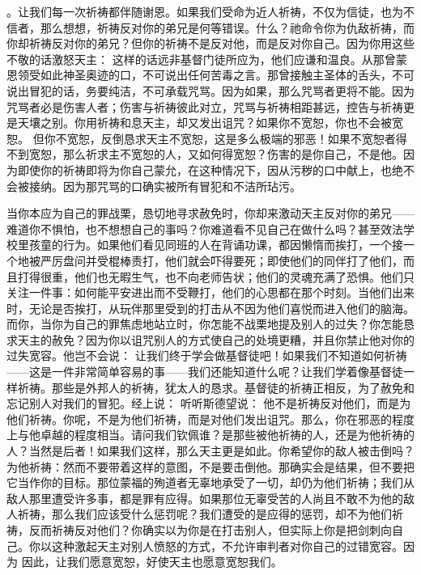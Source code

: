 。让我们每一次祈祷都伴随谢恩。如果我们受命为近人祈祷，不仅为信徒，也为不信者，那么想想，祈祷反对你的弟兄是何等错误。什么？祂命令你为仇敌祈祷，而你却祈祷反对你的弟兄？但你的祈祷不是反对他，而是反对你自己。因为你用这些不敬的话激怒天主：    这样的话远非基督门徒所应为，他们应谦和温良。从那曾蒙恩领受如此神圣奥迹的口，不可说出任何苦毒之言。那曾接触主圣体的舌头，不可说出冒犯的话，务要纯洁，不可承载咒骂。因为如果，那么咒骂者更将不能。因为咒骂者必是伤害人者；伤害与祈祷彼此对立，咒骂与祈祷相距甚远，控告与祈祷更是天壤之别。你用祈祷和息天主，却又发出诅咒？如果你不宽恕，你也不会被宽恕。 但你不宽恕，反倒恳求天主不宽恕，这是多么极端的邪恶！如果不宽恕者得不到宽恕，那么祈求主不宽恕的人，又如何得宽恕？伤害的是你自己，不是他。因为即使你的祈祷即将为你自己蒙允，在这种情况下，因从污秽的口中献上，也绝不会被接纳。因为那咒骂的口确实被所有冒犯和不洁所玷污。\par

当你本应为自己的罪战栗，恳切地寻求赦免时，你却来激动天主反对你的弟兄——难道你不惧怕，也不想想自己的事吗？你难道看不见自己在做什么吗？甚至效法学校里孩童的行为。如果他们看见同班的人在背诵功课，都因懒惰而挨打，一个接一个地被严厉盘问并受棍棒责打，他们就会吓得要死；即使他们的同伴打了他们，而且打得很重，他们也无暇生气，也不向老师告状；他们的灵魂充满了恐惧。他们只关注一件事：如何能平安进出而不受鞭打，他们的心思都在那个时刻。当他们出来时，无论是否挨打，从玩伴那里受到的打击从不因为他们喜悦而进入他们的脑海。而你，当你为自己的罪焦虑地站立时，你怎能不战栗地提及别人的过失？你怎能恳求天主的赦免？因为你以诅咒别人的方式使自己的处境更糟，并且你禁止他对你的过失宽容。他岂不会说： 让我们终于学会做基督徒吧！如果我们不知道如何祈祷——这是一件非常简单容易的事——我们还能知道什么呢？让我们学着像基督徒一样祈祷。那些是外邦人的祈祷，犹太人的恳求。基督徒的祈祷正相反，为了赦免和忘记别人对我们的冒犯。经上说：  听听斯德望说：  他不是祈祷反对他们，而是为他们祈祷。你呢，不是为他们祈祷，而是对他们发出诅咒。那么，你在邪恶的程度上与他卓越的程度相当。请问我们钦佩谁？是那些被他祈祷的人，还是为他祈祷的人？当然是后者！如果我们这样，那么天主更是如此。你希望你的敌人被击倒吗？为他祈祷：然而不要带着这样的意图，不是要击倒他。那确实会是结果，但不要把它当作你的目标。那位蒙福的殉道者无辜地承受了一切，却仍为他们祈祷；我们从敌人那里遭受许多事，都是罪有应得。如果那位无辜受苦的人尚且不敢不为他的敌人祈祷，那么我们应该受什么惩罚呢？我们遭受的是应得的惩罚，却不为他们祈祷，反而祈祷反对他们？你确实以为你是在打击别人，但实际上你是把剑刺向自己。你以这种激起天主对别人愤怒的方式，不允许审判者对你自己的过错宽容。因为   因此，让我们愿意宽恕，好使天主也愿意宽恕我们。\par

